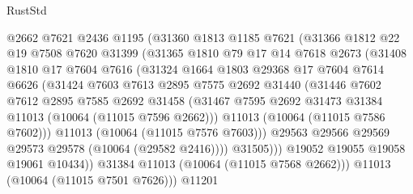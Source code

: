 \begin{lexlean}{RustStd}
\begin{coremodule}
                  @2662
                  @7621
                  @2436
                  @1195
                  (@31360
                    @1813
                    @1185
                    @7621
                    (@31366
                      @1812
                      @22
                      @19
                      @7508
                      @7620
                      @31399
                      (@31365
                        @1810
                        @79
                        @17
                        @14
                        @7618
                        @2673
                        (@31408
                          @1810
                          @17
                          @7604
                          @7616
                          (@31324
                            @1664
                            @1803
                            @29368
                            @17
                            @7604
                            @7614
                            @6626
                            (@31424
                              @7603
                              @7613
                              @2895
                              @7575
                              @2692
                              @31440
                              (@31446
                                @7602
                                @7612
                                @2895
                                @7585
                                @2692
                                @31458
                                (@31467
                                  @7595
                                  @2692
                                  @31473
                                  @31384
                                  @11013
                                  (@10064 (@11015 @7596 @2662)))
                                @11013
                                (@10064 (@11015 @7586 @7602)))
                              @11013
                              (@10064 (@11015 @7576 @7603)))
                            @29563
                            @29566
                            @29569
                            @29573
                            @29578
                            (@10064 (@29582 @2416))))
                        @31505)))
                  @19052
                  @19055
                  @19058
                  @19061
                  @10434))
              @31384
              @11013
              (@10064 (@11015 @7568 @2662)))
            @11013
            (@10064 (@11015 @7501 @7626)))
          @11201

\end{coremodule}
\end{lexlean}
